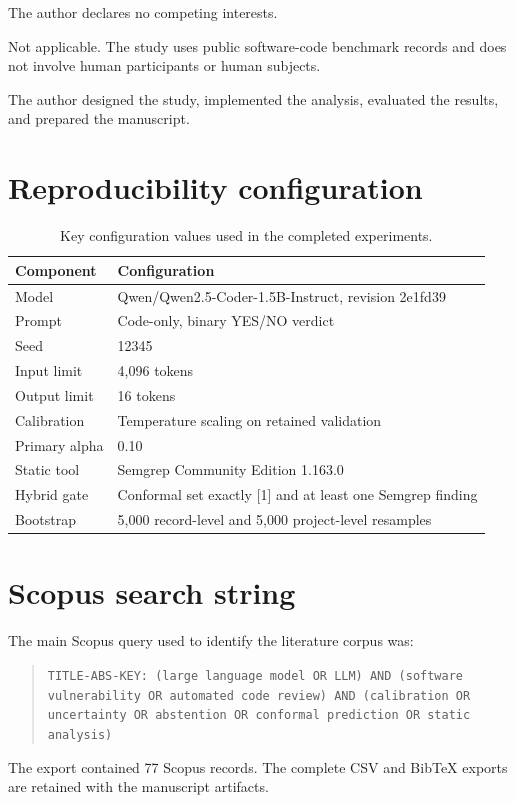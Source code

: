 \documentclass[pdflatex,sn-mathphys-num]{sn-jnl}
\begin{document}
The author declares no competing interests.

Not applicable. The study uses public software-code benchmark records and does not involve human participants or human subjects.

The author designed the study, implemented the analysis, evaluated the results, and prepared the manuscript.

\begin{appendices}
\section{Reproducibility configuration}\label{app:config}

\begin{table}[htbp]
\caption{Key configuration values used in the completed experiments.}\label{tab:config}
\centering
\begin{tabular}{@{}ll@{}}
\toprule
Component & Configuration\\
\midrule
Model & Qwen/Qwen2.5-Coder-1.5B-Instruct, revision 2e1fd39\\
Prompt & Code-only, binary YES/NO verdict\\
Seed & 12345\\
Input limit & 4,096 tokens\\
Output limit & 16 tokens\\
Calibration & Temperature scaling on retained validation\\
Primary alpha & 0.10\\
Static tool & Semgrep Community Edition 1.163.0\\
Hybrid gate & Conformal set exactly [1] and at least one Semgrep finding\\
Bootstrap & 5,000 record-level and 5,000 project-level resamples\\
\bottomrule
\end{tabular}
\end{table}

\section{Scopus search string}\label{app:search}

The main Scopus query used to identify the literature corpus was:

\begin{quote}\small
\texttt{TITLE-ABS-KEY: (large language model OR LLM) AND (software vulnerability OR automated code review) AND (calibration OR uncertainty OR abstention OR conformal prediction OR static analysis)}
\end{quote}

The export contained 77 Scopus records. The complete CSV and BibTeX exports
are retained with the manuscript artifacts.
\end{appendices}


\end{document}

